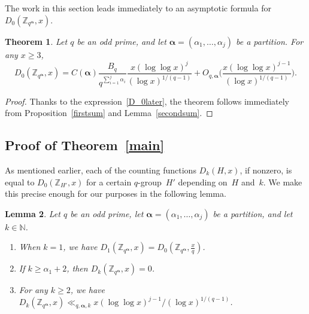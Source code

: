 \documentclass[12pt,reqno]{amsart}
\newtheorem{theorem}{Theorem}[section]
\newtheorem{lemma}[theorem]{Lemma}
\theoremstyle{definition}
\newcommand{\N}{{\mathbb N}}
\newcommand{\Z}{{\mathbb Z}}
\newcommand{\balpha}{{\bm\alpha}}
\begin{document}
The work in this section leads immediately to an asymptotic formula for~$D_0(\Z_{q^\balpha},x)$.

\begin{theorem} \label{D0 prop}
Let $q$ be an odd prime, and let $\balpha=(\alpha_1,\dots,\alpha_j)$ be a partition. For any $x\ge3$,
\[
D_0(\Z_{q^\balpha},x) = C(\balpha) \frac{B_q}{q^{\sum_{i=1}^j\alpha_i}} \frac{x(\log\log x)^j}{(\log x)^{1/(q-1)}} + O_{q,\balpha}\bigg(\frac{x(\log\log x)^{j-1}}{(\log x)^{1/(q-1)}}\bigg).
\]
\end{theorem}

\begin{proof}
Thanks to the expression~\eqref{D_0later}, the theorem follows immediately from Proposition~\ref{firstsum} and Lemma~\ref{secondsum}.
\end{proof}


\subsection{Proof of Theorem~\ref{main}}

As mentioned earlier, each of the counting functions $D_k(H,x)$, if nonzero, is equal to $D_0(\Z_{H'},x)$ for a certain $q$-group~$H'$ depending on~$H$ and~$k$. We make this precise enough for our purposes in the following lemma.

\begin{lemma} \label{handle Dk lemma}
Let $q$ be an odd prime, let $\balpha=(\alpha_1,\dots,\alpha_j)$ be a partition, and let $k\in\N$.
\begin{enumerate}
\item When $k=1$, we have $D_1(\Z_{q^\balpha},x) = D_0(\Z_{q^\balpha},\frac xq)$.
\item If $k\ge \alpha_1+2$, then $D_k(\Z_{q^\balpha},x)=0$.
\item For any $k\ge2$, we have $D_k(\Z_{q^\balpha},x)\ll_{q,\balpha,k} x(\log\log x)^{j-1}/(\log x)^{1/(q-1)}$.
\end{enumerate}
\end{lemma}
\end{document}
